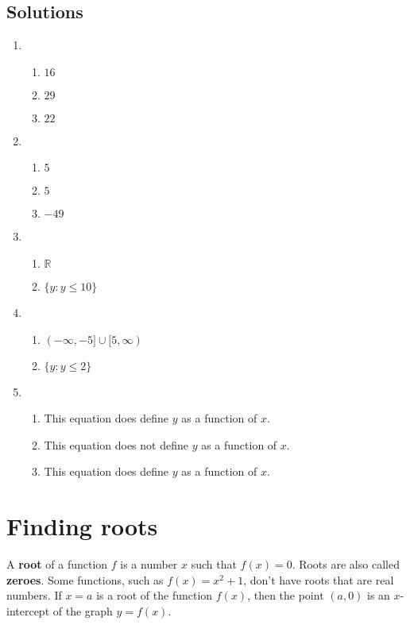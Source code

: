 \documentclass[11pt]{book}               %
\begin{document}
\subsection{Solutions}
\begin{enumerate}
\item 
\begin{enumerate}
\item $16$ 
\item $29$
\item $22$ 
\end{enumerate}
\item 
\begin{enumerate}
\item $5$ 
\item $5$
\item $-49$ 
\end{enumerate}

\item 
\begin{enumerate}
\item $\mathbb{R}$
\item $\{y: y \leq 10\}$
\end{enumerate}

\item 
\begin{enumerate}
\item $(-\infty, -5] \cup [5, \infty)$
\item $\{y: y \leq 2\}$
\end{enumerate}


\item
\begin{enumerate}
\item This equation does define $y$ as a function of $x$.
\item This equation does not define $y$ as a function of $x$.
\item This equation does define $y$ as a function of $x$.
\end{enumerate}
\end{enumerate}

\newpage
\label{section_finding-roots}
\section{Finding roots}

A \textbf{root} of a function $f$ is a number $x$ such that $f(x) = 0$. Roots are also called \textbf{zeroes}.
Some functions, such as $f(x) = x^2+1$, don't have roots that are real numbers.  If $x=a$ is a root of the function $f(x)$, then the point $(a,0)$ is an $x$-intercept of the graph $y=f(x)$. 
\end{document}
